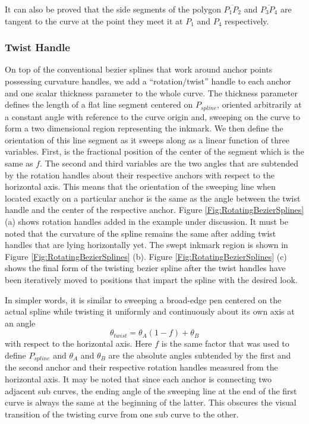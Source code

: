 It can also be proved that the side segments of the polygon $\overline{P_1 P_2}$ and $\overline{P_3 P_4}$ are tangent to the curve at the point they meet it at $P_1$ and $P_4$ respectively.


\subsubsection{Twist Handle}
    On top of the conventional bezier splines that work around anchor points possessing curvature handles, we add a ``rotation/twist'' handle to each anchor and one scalar thickness parameter to the whole curve. The thickness parameter defines the length of a flat line segment centered on $P_{spline}$, oriented arbitrarily at a constant angle with reference to the curve origin and, sweeping on the curve to form a two dimensional region representing the inkmark. We then define the orientation of this line segment as it sweeps along as a linear function of three variables. First, is the fractional position of the center of the segment which is the same as $f$. The second and third variables are the two angles that are subtended by the rotation handles about their respective anchors with respect to the horizontal axis. This means that the orientation of the sweeping line when located exactly on a particular anchor is the same as the angle between the twist handle and the center of the respective anchor. Figure \ref{Fig:RotatingBezierSplines} (a) shows rotation handles added in the example under discussion. It must be noted that the curvature of the spline remains the same after adding twist handles that are lying horizontally yet. The swept inkmark region is shown in Figure \ref{Fig:RotatingBezierSplines} (b). Figure \ref{Fig:RotatingBezierSplines} (c) shows the final form of the twisting bezier spline after the twist handles have been iteratively moved to positions that impart the spline with the desired look.


    In simpler words, it is similar to sweeping a broad-edge pen centered on the actual spline while twisting it uniformly and continuously about its own axis at an angle
    \begin{equation}
    \theta_{twist}=\theta_A  (1-f)+ \theta_B
    \end{equation}
    with respect to the horizontal axis. Here $f$ is the same factor that was used to define $P_{spline}$ and $\theta_A$ and $\theta_B$ are the absolute angles subtended by the first and the second anchor and their respective rotation handles measured from the horizontal axis. It may be noted that since each anchor is connecting two adjacent sub curves, the ending angle of the sweeping line at the end of the first curve is always the same at the beginning of the latter. This obscures the visual transition of the twisting curve from one sub curve to the other.

